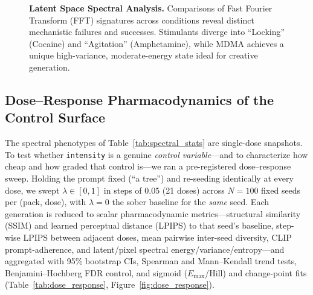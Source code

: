 \documentclass[10pt]{article}
\begin{document}
\begin{figure}[!b]
    \caption{\textbf{Latent Space Spectral Analysis.} Comparisons of Fast Fourier Transform (FFT) signatures across conditions reveal distinct mechanistic failures and successes. Stimulants diverge into ``Locking'' (Cocaine) and ``Agitation'' (Amphetamine), while MDMA achieves a unique high-variance, moderate-energy state ideal for creative generation.}
    \label{fig:spectral_analysis_sequence}
\end{figure}

\begin{table}[ht]
    \centering
    \caption{\textbf{Latent Space Spectral Statistics.} Quantitative analysis of the diffusion model's internal state ($N=128$ generations).}
    \label{tab:spectral_stats}
\end{table}

\subsection{Dose--Response Pharmacodynamics of the Control Surface}
The spectral phenotypes of Table~\ref{tab:spectral_stats} are single-dose snapshots. To test whether \texttt{intensity} is a genuine \emph{control variable}---and to characterize how cheap and how graded that control is---we ran a pre-registered dose--response sweep. Holding the prompt fixed (``a tree'') and re-seeding identically at every dose, we swept $\lambda \in [0,1]$ in steps of $0.05$ (21 doses) across $N=100$ fixed seeds per (pack, dose), with $\lambda{=}0$ the sober baseline for the \emph{same} seed. Each generation is reduced to scalar pharmacodynamic metrics---structural similarity (SSIM) and learned perceptual distance (LPIPS) to that seed's baseline, step-wise LPIPS between adjacent doses, mean pairwise inter-seed diversity, CLIP prompt-adherence, and latent/pixel spectral energy/variance/entropy---and aggregated with 95\% bootstrap CIs, Spearman and Mann--Kendall trend tests, Benjamini--Hochberg FDR control, and sigmoid ($E_{\max}$/Hill) and change-point fits (Table~\ref{tab:dose_response}, Figure~\ref{fig:dose_response}).
\end{document}
